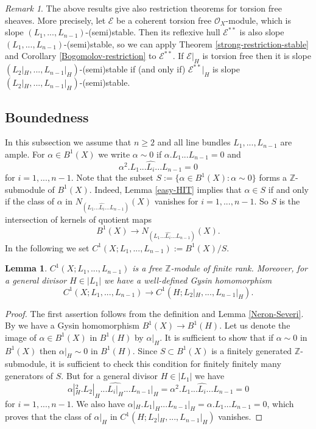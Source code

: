\documentclass[12pt]{article}
\theoremstyle{plain}
\newtheorem{Lemma}[Thm]{\sc Lemma}
\theoremstyle{definition}
\theoremstyle{remark}
\newtheorem{Remark}[Thm]{Remark}
\newcommand{\ZZ}{{\mathbb Z}}
\newcommand{\cE}{{\mathcal E}}
\newcommand{\cO}{{\mathcal O}}
\begin{document}
\begin{Remark}
	The above results give also restriction theorems for torsion free sheaves. More precisely,
	let $\cE$ be a coherent torsion free $\cO_X$-module, which is slope $(L_1,...,L_{n-1})$-(semi)stable. Then its reflexive hull $\cE^{**}$ is also slope $(L_1,...,L_{n-1})$-(semi)stable, so we can apply Theorem \ref{strong-restriction-stable}
	and Corollary \ref{Bogomolov-restriction} to  $\cE^{**}$. If $\cE|_H$ is torsion free then it is slope $(L_2|_H,...,L_{n-1}|_H)$-(semi)stable if (and only if) $\cE^{**}|_H$ is slope $(L_2|_H,...,L_{n-1}|_H)$-(semi)stable.	
\end{Remark}

\subsection{Boundedness}

In this subsection we assume that $n\ge 2$ and  all line bundles $L_1,...,L_{n-1}$ are ample.  
For $\alpha\in B^1(X)$ we write $\alpha\sim 0$ if $\alpha.L_1...L_{n-1}=0$ and
$$\alpha^2.L_1...\widehat{L_i}...L_{n-1}=0$$
for $i=1,...,n-1$. Note that the subset $S:=\{\alpha\in B^1(X) : \alpha\sim 0\}$ forms a $\ZZ$-submodule of $B^1(X)$.
Indeed, Lemma \ref{easy-HIT} implies that $\alpha \in S$ if and only if  the class of $\alpha$ in $N_{(L_1...\widehat{L_i}...L_{n-1})}(X)$ vanishes for
$i=1,...,n-1$. So $S$ is the intersection of kernels of quotient maps
$$B^1(X)\to N_{(L_1...\widehat{L_i}...L_{n-1})}(X).$$
In the following we  set $C^1(X; L_1,...,L_{n-1}):=B^1(X)/S$. 

\begin{Lemma}\label{injection}
$C^1(X;L_1,...,L_{n-1})$ is a free $\ZZ$-module of finite rank. Moreover, for
a general divisor $H\in |L_1|$ we have a well-defined Gysin homomorphism 
$$C^1(X;L_1,...,L_{n-1})\to C^1(H;L_2|_H,...,L_{n-1}|_H).$$
\end{Lemma}

\begin{proof} The first assertion follows from the definition and Lemma \ref{Neron-Severi}.
By \cite[Proposition 10.3]{Fu} we have a Gysin homomorphism $B^1(X)\to B^1(H)$. Let us denote the image of  
$\alpha \in B^1(X)$ in $B^1(H)$ by $\alpha |_H$. It is sufficient to show that if $\alpha\sim 0$ in $B^1(X)$ then $\alpha|_H\sim 0$ in $B^1(H)$. Since $S\subset B^1(X)$ is a finitely generated $\ZZ$-submodule, it is sufficient to check this condition for finitely finitely many generators of $S$. But for a general divisor  $H\in |L_1|$ 
we have 
$$\alpha|_H^2.L_2|_H...\widehat{L_i|_H}...L_{n-1}|_H=\alpha^2.L_1...\widehat{L_i}...L_{n-1}=0$$
for $i=1,...,n-1$. We also have $\alpha|_H.L_1|_H...L_{n-1}|_H=\alpha.L_1...L_{n-1}=0$, which proves that
the class of  $\alpha|_H$ in $C^1(H;L_2|_H,...,L_{n-1}|_H)$ vanishes.
\end{proof}
\end{document}

